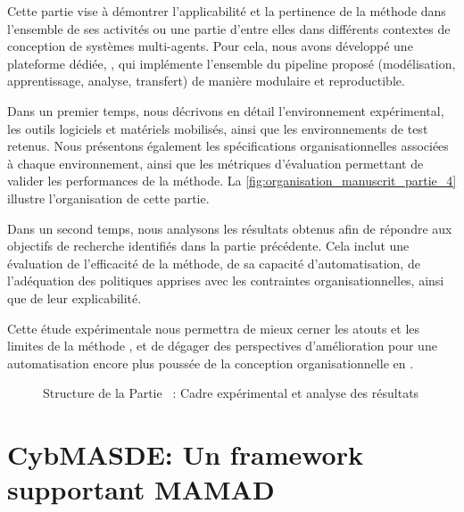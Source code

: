 \noindent
Cette partie vise à démontrer l'applicabilité et la pertinence de la méthode  dans l'ensemble de ses activités ou une partie d'entre elles dans différents contextes de conception de systèmes multi-agents. Pour cela, nous avons développé une plateforme dédiée, , qui implémente l'ensemble du pipeline proposé (modélisation, apprentissage, analyse, transfert) de manière modulaire et reproductible.

\medskip

\noindent
Dans un premier temps, nous décrivons en détail l'environnement expérimental, les outils logiciels et matériels mobilisés, ainsi que les environnements de test retenus. Nous présentons également les spécifications organisationnelles associées à chaque environnement, ainsi que les métriques d'évaluation permettant de valider les performances de la méthode. La \autoref{fig:organisation_manuscrit_partie_4} illustre l'organisation de cette partie.

\medskip

\noindent
Dans un second temps, nous analysons les résultats obtenus afin de répondre aux objectifs de recherche identifiés dans la partie précédente. Cela inclut une évaluation de l'efficacité de la méthode, de sa capacité d'automatisation, de l'adéquation des politiques apprises avec les contraintes organisationnelles, ainsi que de leur explicabilité.

\medskip

\noindent
Cette étude expérimentale nous permettra de mieux cerner les atouts et les limites de la méthode , et de dégager des perspectives d'amélioration pour une automatisation encore plus poussée de la conception organisationnelle en .



\begin{figure}[h!]
  \centering
  \resizebox{0.8\linewidth}{!}{%
    
  }
  \caption{Structure de la Partie ~: Cadre expérimental et analyse des résultats}
  \label{fig:organisation_manuscrit_partie_4}
\end{figure}

\clearpage
\thispagestyle{empty}
\null
\newpage

\chapter{CybMASDE: Un framework supportant MAMAD}
\label{sec:cybmasde}

